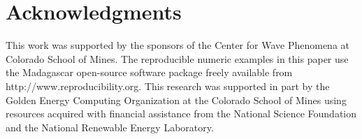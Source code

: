 \section{Acknowledgments}
%
This work was supported by the sponsors of the Center for Wave Phenomena at Colorado School of Mines.
%
The reproducible numeric examples in this paper use the Madagascar open-source software package freely available from http://www.reproducibility.org.
%
This research was supported in part by the Golden Energy Computing Organization at the Colorado School of Mines using resources acquired with financial assistance from the National Science Foundation and the National Renewable Energy Laboratory.
